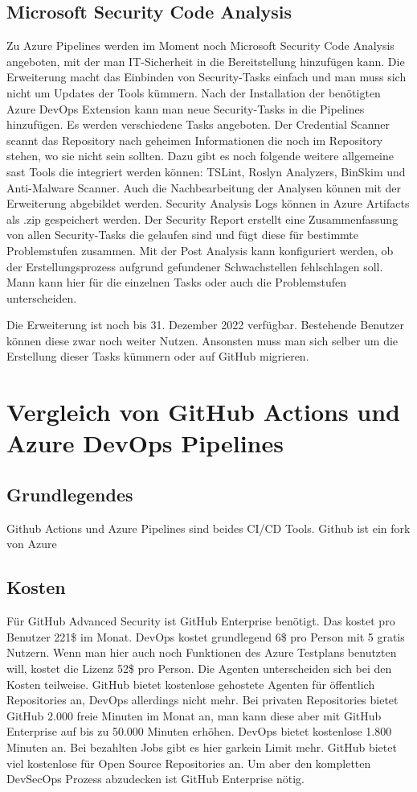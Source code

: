\section{Microsoft Security Code Analysis}
Zu Azure Pipelines werden im Moment noch Microsoft Security Code Analysis angeboten, mit der man IT-Sicherheit in die Bereitstellung hinzufügen kann.
Die Erweiterung macht das Einbinden von Security-Tasks einfach und man muss sich nicht um Updates der Tools kümmern. Nach der Installation der benötigten Azure DevOps Extension kann man neue Security-Tasks in die Pipelines hinzufügen. \cite{mic-msca-install}
Es werden verschiedene Tasks angeboten. Der Credential Scanner scannt das Repository nach geheimen Informationen die noch im Repository stehen, wo sie nicht sein sollten. Dazu gibt es noch folgende weitere allgemeine \ac{sast} Tools die integriert werden können: TSLint, Roslyn Analyzers, BinSkim und Anti-Malware Scanner.
Auch die Nachbearbeitung der Analysen können mit der Erweiterung abgebildet werden. Security Analysis Logs können in Azure Artifacts als .zip gespeichert werden. Der Security Report erstellt eine Zusammenfassung von allen Security-Tasks die gelaufen sind und fügt diese für bestimmte Problemstufen zusammen. Mit der Post Analysis kann konfiguriert werden, ob der Erstellungsprozess aufgrund gefundener Schwachstellen fehlschlagen soll. Mann kann hier für die einzelnen Tasks oder auch die Problemstufen unterscheiden. \cite{mic-msca-generall}

Die Erweiterung ist noch bis 31. Dezember 2022 verfügbar. Bestehende Benutzer können diese zwar noch weiter Nutzen. Ansonsten muss man sich selber um die Erstellung dieser Tasks kümmern oder auf GitHub migrieren. \cite{mic-msca-generall}

\chapter{Vergleich von GitHub Actions und Azure DevOps Pipelines}
\section{Grundlegendes}
Github Actions und Azure Pipelines sind beides CI/CD Tools. Github ist ein fork von Azure

\section{Kosten}
Für GitHub Advanced Security ist GitHub Enterprise benötigt. Das kostet pro Benutzer 221\$ im Monat. DevOps kostet grundlegend 6\$ pro Person mit 5 gratis Nutzern. Wenn man hier auch noch Funktionen des Azure Testplans benutzten will, kostet die Lizenz 52\$ pro Person.
Die Agenten unterscheiden sich bei den Kosten teilweise. GitHub bietet kostenlose gehostete Agenten für öffentlich Repositories an, DevOps allerdings nicht mehr. Bei privaten Repositories bietet GitHub 2.000 freie Minuten im Monat an, man kann diese aber mit GitHub Enterprise auf bis zu 50.000 Minuten erhöhen. DevOps bietet kostenlose 1.800 Minuten an. Bei bezahlten Jobs gibt es hier garkein Limit mehr. 
GitHub bietet viel kostenlose für Open Source Repositories an. Um aber den kompletten DevSecOps Prozess abzudecken ist GitHub Enterprise nötig.

